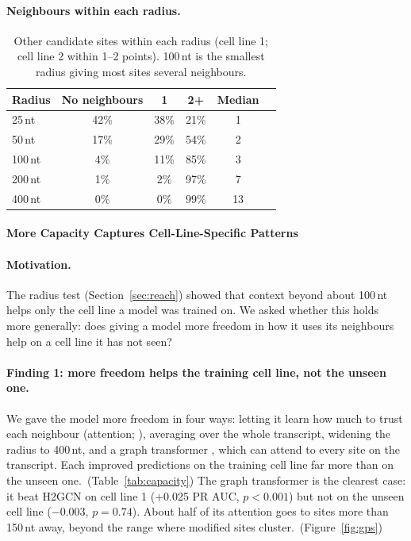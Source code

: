 \documentclass[11pt,a4paper]{article}
\begin{document}
\paragraph{Neighbours within each radius.}
\begin{table}[H]
    \centering\small
    \begin{tabular}{lccccc}
        \toprule
        \textbf{Radius} & \textbf{No neighbours} & \textbf{1} & \textbf{2+} & \textbf{Median} \\
        \midrule
        25\,nt & 42\% & 38\% & 21\% & 1 \\
        50\,nt & 17\% & 29\% & 54\% & 2 \\
        100\,nt & 4\% & 11\% & 85\% & 3 \\
        200\,nt & 1\% & 2\% & 97\% & 7 \\
        400\,nt & 0\% & 0\% & 99\% & 13 \\
        \bottomrule
    \end{tabular}
    \caption{Other candidate sites within each radius (cell line 1; cell line
    2 within 1--2 points). 100\,nt is the smallest radius giving most sites
    several neighbours.}
    \label{tab:nbrradius}
\end{table}

\label{app:capacity-findings}
\paragraph{More Capacity Captures Cell-Line-Specific Patterns}


\paragraph{Motivation.}
The radius test (Section~\ref{sec:reach}) showed that context beyond about 100\,nt helps only the cell line a model was trained on. We asked whether this holds more generally: does giving a model more freedom in how it uses its neighbours help on a cell line it has not seen?

\paragraph{Finding 1: more freedom helps the training cell line, not the unseen one.}
We gave the model more freedom in four ways: letting it learn how much to trust each neighbour (attention; \citealp{velickovic2018}), averaging over the whole transcript, widening the radius to 400\,nt, and a graph transformer \citep{rampasek2022}, which can attend to every site on the transcript. Each improved predictions on the training cell line far more than on the unseen one.~(Table~\ref{tab:capacity}) The graph transformer is the clearest case: it beat H2GCN on cell line 1 (+0.025 PR AUC, $p<0.001$) but not on the unseen cell line ($-0.003$, $p=0.74$). About half of its attention goes to sites more than 150\,nt away, beyond the range where modified sites cluster.~(Figure~\ref{fig:gps})
\end{document}
